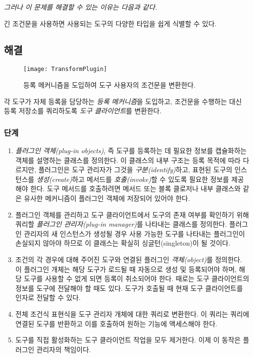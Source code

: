 \documentclass[a4paper,10pt,twoside]{book}
\begin{document}
\emph{그러나 이 문제를 해결할 수 있는 이유는 다음과 같다.}

\begin{bulletlist}
\item 긴 조건문을 사용하면 사용되는 도구의 다양한 타입을 쉽게 식별할 수 있다.
\end{bulletlist}

\subsection*{해결}

\begin{figure}
\begin{center}
\texttt{[image: TransformPlugin]}
\caption{등록 메커니즘을 도입하여 도구 사용자의 조건문을 변환한다.}
\end{center}
\end{figure}

각 도구가 자체 등록을 담당하는 \emph{등록 메커니즘}을 도입하고, 조건문을 수행하는 대신 등록 저장소를 쿼리하도록 \emph{도구 클라이언트}를 변환한다.

\subsubsection*{단계}
\begin{enumerate}
\item \emph{플러그인 객체(plug-in objects)}, 즉 도구를 등록하는 데 필요한 정보를 캡슐화하는 객체를 설명하는 클래스를 정의한다. 이 클래스의 내부 구조는 등록 목적에 따라 다르지만, 플러그인은 도구 관리자가 그것을 \emph{구분(identify)}하고, 표현된 도구의 인스턴스를 \emph{생성(create)}하고 메서드를 \emph{호출(invoke)}할 수 있도록 필요한 정보를 제공해야 한다. 도구 메서드를 호출하려면 메서드 또는 블록 클로저나 내부 클래스와 같은 유사한 메커니즘이 플러그인 객체에 저장되어 있어야 한다. 

\item 플러그인 객체를 관리하고 도구 클라이언트에서 도구의 존재 여부를 확인하기 위해 쿼리할 \emph{플러그인 관리자(plug-in manager)}를 나타내는 클래스를 정의한다. 플러그인 관리자의 새 인스턴스가 생성될 경우 사용 가능한 도구를 나타내는 플러그인이 손실되지 않아야 하므로 이 클래스는 확실히 싱글턴(singleton)이 될 것이다.

\item 조건의 각 경우에 대해 주어진 도구와 연결된 플러그인 \emph{객체(object)}를 정의한다. 이 플러그인 개체는 해당 도구가 로드될 때 자동으로 생성 및 등록되어야 하며, 해당 도구를 사용할 수 없게 되면 등록이 취소되어야 한다. 때로는 도구 클라이언트의 정보를 도구에 전달해야 할 때도 있다. 도구가 호출될 때 현재 도구 클라이언트를 인자로 전달할 수 있다. 

\item 전체 조건식 표현식을 도구 관리자 개체에 대한 쿼리로 변환한다. 이 쿼리는 쿼리에 연결된 도구를 반환하고 이를 호출하여 원하는 기능에 액세스해야 한다.

\item 도구를 직접 활성화하는 도구 클라이언트 작업을 모두 제거한다. 이제 이 동작은 플러그인 관리자의 책임이다.
\end{enumerate}
\end{document}
